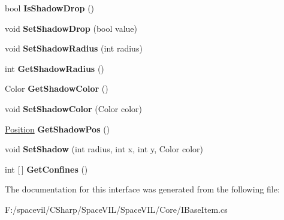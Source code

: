 \begin{DoxyCompactItemize}
bool {\bfseries Is\+Shadow\+Drop} ()
\item 
\mbox{\label{interface_space_v_i_l_1_1_core_1_1_i_base_item_ada0aea4ea1e78acff64faee35e58bb9f}} 
void {\bfseries Set\+Shadow\+Drop} (bool value)
\item 
\mbox{\label{interface_space_v_i_l_1_1_core_1_1_i_base_item_a4eccb5110f10f763a159c9034b1bfbf8}} 
void {\bfseries Set\+Shadow\+Radius} (int radius)
\item 
\mbox{\label{interface_space_v_i_l_1_1_core_1_1_i_base_item_aec002ae19753be8723b2d0fc07a2b9d5}} 
int {\bfseries Get\+Shadow\+Radius} ()
\item 
\mbox{\label{interface_space_v_i_l_1_1_core_1_1_i_base_item_a64efed99ccbddd1ae2f0003b5497f0a4}} 
Color {\bfseries Get\+Shadow\+Color} ()
\item 
\mbox{\label{interface_space_v_i_l_1_1_core_1_1_i_base_item_a6c4fdb19a36657da9bb23c1f94fd8681}} 
void {\bfseries Set\+Shadow\+Color} (Color color)
\item 
\mbox{\label{interface_space_v_i_l_1_1_core_1_1_i_base_item_ab4030e9ed3774554f911a7d4c59957ee}} 
\mbox{\hyperlink{class_space_v_i_l_1_1_core_1_1_position}{Position}} {\bfseries Get\+Shadow\+Pos} ()
\item 
\mbox{\label{interface_space_v_i_l_1_1_core_1_1_i_base_item_a549826d52383f33dd94768b4cd643595}} 
void {\bfseries Set\+Shadow} (int radius, int x, int y, Color color)
\item 
\mbox{\label{interface_space_v_i_l_1_1_core_1_1_i_base_item_ac63b1b301b574f6cb61e3eaa02a84f55}} 
int \mbox{[}$\,$\mbox{]} {\bfseries Get\+Confines} ()
\end{DoxyCompactItemize}


The documentation for this interface was generated from the following file\+:\begin{DoxyCompactItemize}
\item 
F\+:/spacevil/\+C\+Sharp/\+Space\+V\+I\+L/\+Space\+V\+I\+L/\+Core/I\+Base\+Item.\+cs\end{DoxyCompactItemize}
